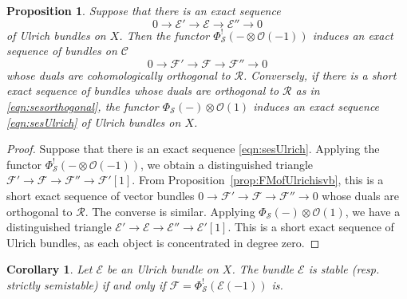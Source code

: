 \documentclass[12pt, letterpaper]{amsart}
\newtheorem{proposition}[theorem]{Proposition}
\newtheorem{corollary}[theorem]{Corollary}
\theoremstyle{definition}
\newcommand{\cC}{\mathcal{C} }
\newcommand{\cE}{\mathcal{E} }
\newcommand{\cF}{\mathcal{F} }
\newcommand{\cO}{\mathcal{O} }
\newcommand{\cR}{\mathcal{R} }
\newcommand{\cS}{\mathcal{S} }
\begin{document}
\begin{proposition}\label{prop:Sequivalence}
Suppose that there is an exact sequence
\begin{equation}\label{eqn:sesUlrich}
0 \to \cE' \to \cE \to \cE'' \to 0
\end{equation}
of Ulrich bundles on \(X\). Then the functor \(\Phi_{\cS}^!(- \otimes \cO(-1))\) induces an exact sequence of bundles on \(\cC\)
\begin{equation}\label{eqn:sesorthogonal}
0 \to \cF' \to \cF \to \cF'' \to 0
\end{equation}
whose duals are cohomologically orthogonal to \(\cR\). Conversely, if there is a short exact sequence of bundles whose duals are orthogonal to \(\cR\) as in \eqref{eqn:sesorthogonal}, the functor \(\Phi_{\cS}(-)\otimes \cO(1)\) induces an exact sequence \eqref{eqn:sesUlrich} of Ulrich bundles on \(X\).
\end{proposition}

\begin{proof}
Suppose that there is an exact sequence \eqref{eqn:sesUlrich}. Applying the functor \(\Phi_{\cS}^!(- \otimes \cO(-1))\), we obtain a distinguished triangle \(\cF' \to \cF \to \cF''\to \cF'[1]\). From Proposition~\ref{prop:FMofUlrichisvb}, this is a short exact sequence of vector bundles \(0 \to \cF' \to \cF \to \cF'' \to 0\) whose duals are orthogonal to \(\cR\). The converse is similar. Applying \(\Phi_{\cS}(-)\otimes \cO(1)\), we have a distinguished triangle \(\cE' \to \cE \to \cE'' \to \cE'[1]\). This is a short exact sequence of Ulrich bundles, as each object is concentrated in degree zero.
\end{proof}

\begin{corollary}\label{cor:stability}
Let \(\cE\) be an Ulrich bundle on \(X\). The bundle \(\cE\) is stable (resp. strictly semistable) if and only if \(\cF = \Phi_{\cS}^!(\cE(-1))\) is.
\end{corollary}
\end{document}
